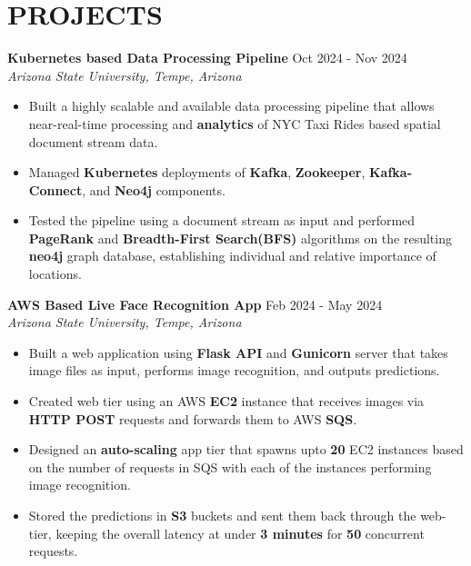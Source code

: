\documentclass[a4paper,9pt]{extarticle}
\begin{document}
\section*{PROJECTS}

\textbf{Kubernetes based Data Processing Pipeline}  \hfill Oct 2024 - Nov 2024\\ %
\textit{Arizona State University, Tempe, Arizona} %
\begin{itemize}
    \item Built a highly scalable and available data processing pipeline that allows near-real-time processing and \textbf{analytics} of NYC Taxi Rides based spatial document stream data.
    \item Managed \textbf{Kubernetes} deployments of \textbf{Kafka}, \textbf{Zookeeper}, \textbf{Kafka-Connect}, and \textbf{Neo4j} components.
    \item Tested the pipeline using a document stream as input and performed \textbf{PageRank} and \textbf{Breadth-First Search(BFS)} algorithms on the resulting \textbf{neo4j} graph database, establishing individual and relative importance of locations. 
    
\end{itemize}

\noindent
\textbf{AWS Based Live Face Recognition App}  \hfill Feb 2024 - May 2024\\ %
\textit{Arizona State University, Tempe, Arizona} %
\begin{itemize}
    \item Built a web application using \textbf{Flask API} and \textbf{Gunicorn} server that takes image files as input, performs image recognition, and outputs predictions.
    \item Created web tier using an AWS \textbf{EC2} instance that receives images via \textbf{HTTP POST} requests and forwards them to AWS \textbf{SQS}.
    \item Designed an \textbf{auto-scaling} app tier that spawns upto \textbf{20} EC2 instances based on the number of requests in SQS with each of the instances performing image recognition.
    \item Stored the predictions in \textbf{S3} buckets and sent them back through the web-tier, keeping the overall latency at under \textbf{3 minutes} for \textbf{50} concurrent requests.
    
\end{itemize}
\end{document}
